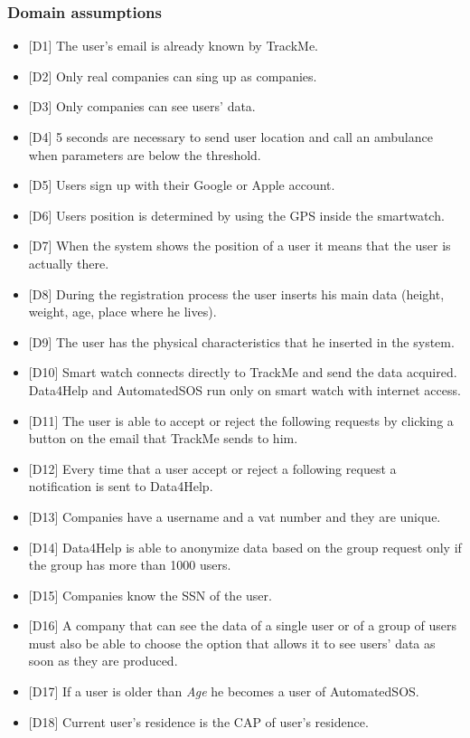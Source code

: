 \documentclass{article}
\begin{document}
\subsubsection{Domain assumptions}
\begin{itemize}
	\item {[D1]} The user's email is already known by TrackMe.
	\item {[D2]} Only real companies can sing up as companies.
	\item {[D3]} Only companies can see users' data.
	\item {[D4]} 5 seconds are necessary to send user location and call an ambulance when parameters are below the threshold.
	\item {[D5]} Users sign up with their Google or Apple account.
	\item {[D6]} Users position is determined by using the GPS inside the smartwatch.
	\item {[D7]} When the system shows the position of a user it means that the user is
actually there.
	\item {[D8]} During the registration process the user inserts his main data (height, weight, age, place where he lives).
	\item {[D9]} The user has the physical characteristics that he inserted in the system.
	\item {[D10]} Smart watch connects directly to TrackMe and send the data acquired. Data4Help and AutomatedSOS run only on smart watch with internet access.
	\item {[D11]} The user is able to accept or reject the following requests by clicking a button on the email that TrackMe sends to him.
	\item {[D12]} Every time that a user accept or reject a following request a notification is sent to Data4Help.
	\item {[D13]} Companies have a username and a vat number and they are unique.
	\item {[D14]} Data4Help is able to anonymize data based on the group request only if the group has more than 1000 users.
	\item {[D15]} Companies know the SSN of the user. 
	\item {[D16]} A company that can see the data of a single user or of a group of users must also be able to choose the option that allows it to see users' data as soon as they are produced.
	\item {[D17]} If a user is older than \emph{Age} he becomes a user of AutomatedSOS. 
	\item {[D18]} Current user's residence is the CAP of user's residence. 
\end{itemize}\newpage
\end{document}
